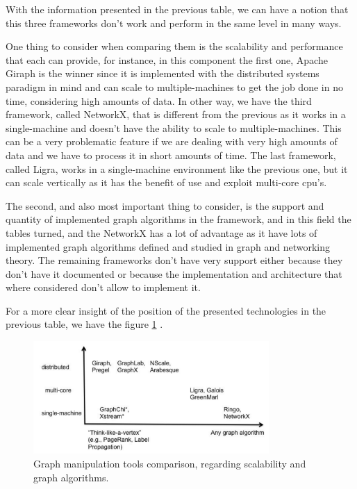 With the information presented in the previous table, we can have a notion that this three frameworks don't work and perform in the same level in many ways. 

One thing to consider when comparing them is the scalability and performance that each can provide, for instance, in this component the first one, Apache Giraph is the winner since it is implemented with the distributed systems paradigm in mind and can scale to multiple-machines to get the job done in no time, considering high amounts of data. In other way, we have the third framework, called NetworkX, that is different from the previous as it works in a single-machine and doesn't have the ability to scale to multiple-machines. This can be a very problematic feature if we are dealing with very high amounts of data and we have to process it in short amounts of time. The last framework, called Ligra, works in a single-machine environment like the previous one, but it can scale vertically as it has the benefit of use and exploit multi-core \gls{cpu}'s. 

The second, and also most important thing to consider, is the support and quantity of implemented graph algorithms in the framework, and in this field the tables turned, and the NetworkX has a lot of advantage as it have lots of implemented graph algorithms defined and studied in graph and networking theory. The remaining frameworks don't have very support either because they don't have it documented or because the implementation and architecture that where considered don't allow to implement it.

For a more clear insight of the position of the presented technologies in the previous table, we have the figure \ref{fig:graph_manipulation_and_performance_tools_diagram_comparison} \cite{graph_data_management_systems}.

\begin{figure}[H]
    \centering
    \includegraphics[width=0.80\textwidth]{images/graph_manipulation_tools_diagram_comparison.pdf}
    \caption{Graph manipulation tools comparison, regarding scalability and graph algorithms.}
    \label{fig:graph_manipulation_and_performance_tools_diagram_comparison}
\end{figure}

